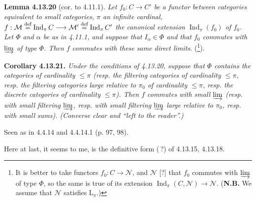 \documentclass[11pt]{article}
\newcommand{\msp}[1]{\marginpar{\footnotesize [#1]}}
\newcommand{\Ind}{\operatorname{Ind}}
\begin{document}
\textbf{Lemma 4.13.20} (cor. to 4.11.1). \textit{Let $f_0 : C\longrightarrow C'$ be a functor between categories equivalent to small categories, $\pi$ an infinite cardinal, $f:\mathcal{M}\stackrel{\textup{def}}{=}\Ind_\pi C\longrightarrow\mathcal{M}'\stackrel{\textup{def}}{=}\Ind_\pi C'$ the canonical extension $\Ind_\pi(f_0)$ of $f_0$. Let $\Phi$ and $\alpha$ be as in 4.11.1, and suppose that $I_\alpha\in\Phi$ and that $f_0$ commutes with $\varinjlim$ of type $\Phi$. Then $f$ commutes with these same direct limits.} (\footnote{It is better to take functors $f_0 : C\longrightarrow\mathcal{N}$, and $\mathcal{N}$ [?] that $f_0$ commutes with $\varinjlim$ of type $\Phi$, so the same is true of its extension $\Ind_\pi(C,\mathcal{N})\longrightarrow\mathcal{N}$. (\textbf{N.B.} We assume that $\mathcal{N}$ satisfies $\mathrm{L}_\pi$.)}).

\textbf{Corollary 4.13.21.} \textit{Under the conditions of 4.13.20, suppose that $\Phi$ contains the categories of cardinality $\leqslant\pi$ (resp. the filtering categories of cardinality $\leqslant\pi$, resp. the filtering categories large relative to $\pi_0$ of cardinality $\leqslant\pi$, resp. the discrete categories of cardinality $\leqslant\pi$). Then $f$ commutes with small $\varinjlim$ (resp. with small filtering $\varinjlim$, resp. with small filtering $\varinjlim$ large relative to $\pi_0$, resp. with small sums). (Converse clear and ``left to the reader''.)}

Seen as in 4.4.14 and 4.4.14.1 (p. 97, 98).

\msp{page 342}
Here at last, it seems to me, is the definitive form (\,?) of 4.13.15, 4.13.18.
\end{document}
